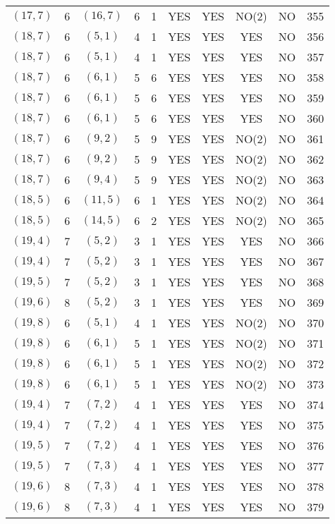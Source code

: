 \begin{longtable}{|c|c|c|c|c|c|c|c|c|c|}
$(17, 7)$ & 6 & $(16, 7)$ & 6 & 1 & YES & YES & NO(2) & NO & 355\\
$(18, 7)$ & 6 & $(5, 1)$ & 4 & 1 & YES & YES & YES & NO & 356\\
$(18, 7)$ & 6 & $(5, 1)$ & 4 & 1 & YES & YES & YES & NO & 357\\
$(18, 7)$ & 6 & $(6, 1)$ & 5 & 6 & YES & YES & YES & NO & 358\\
$(18, 7)$ & 6 & $(6, 1)$ & 5 & 6 & YES & YES & YES & NO & 359\\
$(18, 7)$ & 6 & $(6, 1)$ & 5 & 6 & YES & YES & YES & NO & 360\\
$(18, 7)$ & 6 & $(9, 2)$ & 5 & 9 & YES & YES & NO(2) & NO & 361\\
$(18, 7)$ & 6 & $(9, 2)$ & 5 & 9 & YES & YES & NO(2) & NO & 362\\
$(18, 7)$ & 6 & $(9, 4)$ & 5 & 9 & YES & YES & NO(2) & NO & 363\\
$(18, 5)$ & 6 & $(11, 5)$ & 6 & 1 & YES & YES & NO(2) & NO & 364\\
$(18, 5)$ & 6 & $(14, 5)$ & 6 & 2 & YES & YES & NO(2) & NO & 365\\
$(19, 4)$ & 7 & $(5, 2)$ & 3 & 1 & YES & YES & YES & NO & 366\\
$(19, 4)$ & 7 & $(5, 2)$ & 3 & 1 & YES & YES & YES & NO & 367\\
$(19, 5)$ & 7 & $(5, 2)$ & 3 & 1 & YES & YES & YES & NO & 368\\
$(19, 6)$ & 8 & $(5, 2)$ & 3 & 1 & YES & YES & YES & NO & 369\\
$(19, 8)$ & 6 & $(5, 1)$ & 4 & 1 & YES & YES & NO(2) & NO & 370\\
$(19, 8)$ & 6 & $(6, 1)$ & 5 & 1 & YES & YES & NO(2) & NO & 371\\
$(19, 8)$ & 6 & $(6, 1)$ & 5 & 1 & YES & YES & NO(2) & NO & 372\\
$(19, 8)$ & 6 & $(6, 1)$ & 5 & 1 & YES & YES & NO(2) & NO & 373\\
$(19, 4)$ & 7 & $(7, 2)$ & 4 & 1 & YES & YES & YES & NO & 374\\
$(19, 4)$ & 7 & $(7, 2)$ & 4 & 1 & YES & YES & YES & NO & 375\\
$(19, 5)$ & 7 & $(7, 2)$ & 4 & 1 & YES & YES & YES & NO & 376\\
$(19, 5)$ & 7 & $(7, 3)$ & 4 & 1 & YES & YES & YES & NO & 377\\
$(19, 6)$ & 8 & $(7, 3)$ & 4 & 1 & YES & YES & YES & NO & 378\\
$(19, 6)$ & 8 & $(7, 3)$ & 4 & 1 & YES & YES & YES & NO & 379\\

\end{longtable}
